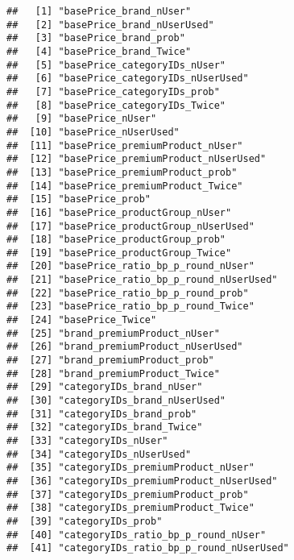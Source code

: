 \documentclass[10pt]{report}
\begin{document}
\begin{verbatim}
##   [1] "basePrice_brand_nUser"                              
##   [2] "basePrice_brand_nUserUsed"                          
##   [3] "basePrice_brand_prob"                               
##   [4] "basePrice_brand_Twice"                              
##   [5] "basePrice_categoryIDs_nUser"                        
##   [6] "basePrice_categoryIDs_nUserUsed"                    
##   [7] "basePrice_categoryIDs_prob"                         
##   [8] "basePrice_categoryIDs_Twice"                        
##   [9] "basePrice_nUser"                                    
##  [10] "basePrice_nUserUsed"                                
##  [11] "basePrice_premiumProduct_nUser"                     
##  [12] "basePrice_premiumProduct_nUserUsed"                 
##  [13] "basePrice_premiumProduct_prob"                      
##  [14] "basePrice_premiumProduct_Twice"                     
##  [15] "basePrice_prob"                                     
##  [16] "basePrice_productGroup_nUser"                       
##  [17] "basePrice_productGroup_nUserUsed"                   
##  [18] "basePrice_productGroup_prob"                        
##  [19] "basePrice_productGroup_Twice"                       
##  [20] "basePrice_ratio_bp_p_round_nUser"                   
##  [21] "basePrice_ratio_bp_p_round_nUserUsed"               
##  [22] "basePrice_ratio_bp_p_round_prob"                    
##  [23] "basePrice_ratio_bp_p_round_Twice"                   
##  [24] "basePrice_Twice"                                    
##  [25] "brand_premiumProduct_nUser"                         
##  [26] "brand_premiumProduct_nUserUsed"                     
##  [27] "brand_premiumProduct_prob"                          
##  [28] "brand_premiumProduct_Twice"                         
##  [29] "categoryIDs_brand_nUser"                            
##  [30] "categoryIDs_brand_nUserUsed"                        
##  [31] "categoryIDs_brand_prob"                             
##  [32] "categoryIDs_brand_Twice"                            
##  [33] "categoryIDs_nUser"                                  
##  [34] "categoryIDs_nUserUsed"                              
##  [35] "categoryIDs_premiumProduct_nUser"                   
##  [36] "categoryIDs_premiumProduct_nUserUsed"               
##  [37] "categoryIDs_premiumProduct_prob"                    
##  [38] "categoryIDs_premiumProduct_Twice"                   
##  [39] "categoryIDs_prob"                                   
##  [40] "categoryIDs_ratio_bp_p_round_nUser"                 
##  [41] "categoryIDs_ratio_bp_p_round_nUserUsed"             

\end{verbatim}
\end{document}
